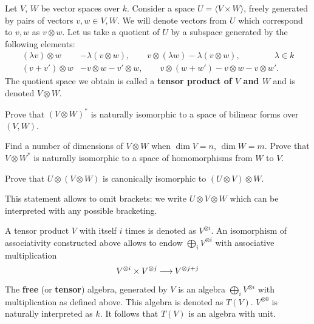 \documentclass[12pt]{article}
\begin{document}
\begin{opredelenie}
  Let $V$, $W$ be vector spaces over $k$. Consider a space $U= \langle
  V\times W\rangle$, freely generated by pairs of vectors $v, w\in V,
  W$. We will denote vectors from $U$ which correspond to $v, w$ as
  $v\otimes w$. Let us take a quotient of $U$ by a subspace generated
  by the following elements:
\begin{align*}
(\lambda v)\otimes w &- \lambda (v
  \otimes w), \qquad v\otimes (\lambda w ) - \lambda (v
  \otimes w), 
\qquad\qquad \lambda\in k\\
(v+v')\otimes w &- v\otimes w - v'\otimes w, \qquad
   v\otimes (w+w') - v\otimes w - v\otimes w'.
\end{align*}
The quotient space we obtain is called a {\bf tensor product of $V$ and
  $W$} and is denoted $V\otimes W$.
\end{opredelenie}

\begin{zadacha}[!]
  Prove that $(V\otimes W)^*$ is naturally isomorphic to a space of
  bilinear forms over $(V, W)$.
\end{zadacha}

\begin{zadacha}
  Find a number of dimensions of $V\otimes W$ when $\dim V=n$, $\dim
  W=m$.  Prove that $V\otimes W^*$ is naturally isomorphic to a space
  of homomorphisms from $W$ to $V$.
\end{zadacha}

\begin{zadacha}[!]
Prove that  $U\otimes (V\otimes W)$ is canonically isomorphic to
$(U\otimes V)\otimes W$.
\end{zadacha}

\begin{zamechanie}
This statement allows to omit brackets: we write
$U\otimes V\otimes W$ which can be interpreted with any possible
bracketing.
\end{zamechanie}

\begin{zamechanie}
A tensor product $V$ with itself $i$ times is denoted as 
$V^{\otimes i}$. An isomorphism of associativity constructed above
allows to endow $\bigoplus_i V^{\otimes i}$ with associative
multiplication 
\[
V^{\otimes i}\times V^{\otimes j}{\:\longrightarrow\:} V^{\otimes {j+j}}
\]
\end{zamechanie}

\begin{opredelenie}
  The {\bf free} (or {\bf tensor}) algebra, generated by $V$ is an
  algebra $\bigoplus_i V^{\otimes i}$ with multiplication as defined
  above. This algebra is denoted as $T(V)$. $V^{\otimes 0}$ is
  naturally interpreted as $k$. It follows that $T(V)$ is an algebra
  with unit.
\end{opredelenie}
\end{document}
